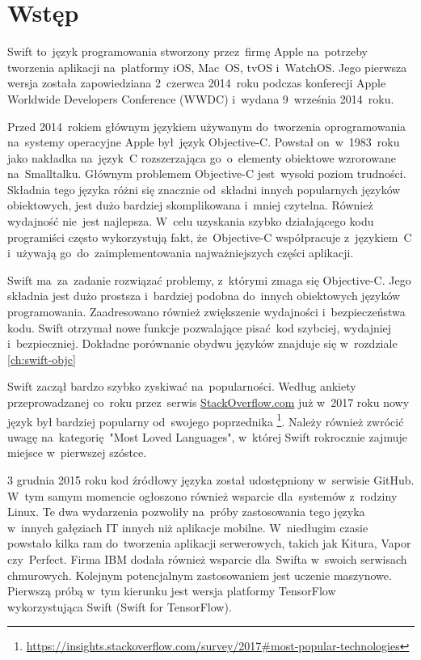 \documentclass[mgr, shortabstract]{iithesis}
\author         {Maksymilian Debeściak}
\begin{document}

\chapter{Wstęp}
\label{ch:wstep}

Swift to~język programowania stworzony przez~firmę Apple na~potrzeby tworzenia aplikacji na~platformy iOS, Mac~OS, tvOS i~WatchOS. Jego pierwsza wersja została zapowiedziana 2~czerwca 2014~roku podczas konferecji Apple Worldwide Developers Conference (WWDC) i~wydana 9~września 2014~roku.

Przed 2014~rokiem głównym językiem używanym do~tworzenia oprogramowania na~systemy operacyjne Apple był~język Objective-C. Powstał on~w~1983~roku jako nakładka na~język~C rozszerzająca go~o~elementy obiektowe wzrorowane na~Smalltalku. Głównym problemem Objective-C jest~wysoki poziom trudności. Składnia tego języka różni się znacznie od~składni innych popularnych języków obiektowych, jest dużo bardziej skomplikowana i~mniej czytelna. Również wydajność nie~jest najlepsza. W~celu uzyskania szybko działającego kodu programiści często wykorzystują fakt, że~Objective-C współpracuje z~językiem~C i~używają go~do~zaimplementowania najważniejszych części aplikacji. 

Swift ma~za~zadanie rozwiązać problemy, z~którymi zmaga się Objective-C. Jego składnia jest dużo prostsza i~bardziej podobna do~innych obiektowych języków programowania. Zaadresowano również zwiększenie wydajności i~bezpieczeństwa kodu. Swift otrzymał nowe funkcje pozwalające pisać kod szybciej, wydajniej i~bezpieczniej. Dokładne porównanie obydwu języków znajduje się w~rozdziale \ref{ch:swift-objc}

Swift zaczął bardzo szybko zyskiwać na~popularności. Według ankiety przeprowadzanej co~roku przez~serwis \url{StackOverflow.com} już w~2017 roku nowy język był bardziej popularny od~swojego poprzednika \footnote{\url{https://insights.stackoverflow.com/survey/2017\#most-popular-technologies}}. Należy również zwrócić uwagę na~kategorię "Most Loved Languages", w~której Swift rokrocznie zajmuje miejsce w~pierwszej szóstce.

3 grudnia 2015 roku kod źródłowy języka został udostępniony w~serwisie GitHub. W~tym samym momencie ogłoszono również wsparcie dla~systemów z~rodziny Linux. Te dwa wydarzenia pozwoliły na~próby zastosowania tego języka w~innych gałęziach IT innych niż aplikacje mobilne. W~niedługim czasie powstało kilka ram do~tworzenia aplikacji serwerowych, takich jak Kitura, Vapor czy~Perfect. Firma IBM dodała również wsparcie dla~Swifta w~swoich serwisach chmurowych. Kolejnym potencjalnym zastosowaniem jest uczenie maszynowe. Pierwszą próbą w~tym kierunku jest wersja platformy TensorFlow wykorzystująca Swift (Swift for TensorFlow).
\end{document}
